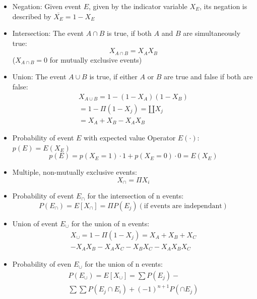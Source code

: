 \documentclass[8pt, landscape, fleqn]{scrartcl}
\begin{document}
\begin{multicols*}{3}
\begin{itemize}
    \item Negation: Given event $E$, given by the indicator variable $X_E$, its negation is described by $\overline{X_E} = 1-X_E$
    \item Intersection: The event $A \cap B$ is true, if both $A$ and $B$ are simultaneously true: \begin{equation} X_{A\cap B} = X_A X_B \end{equation} ($X_{A\cap B} = 0$ for mutually exclusive events)
    \item Union: The event $A \cup B$ is true, if either $A$ or $B$ are true and false if both are false: \begin{align} X_{A \cup B} = 1-(1-X_A)(1-X_B)\\= 1- \Pi(1-X_j) = \amalg X_j \\ = X_A + X_B - X_A X_B \end{align}
    \item Probability of event $E$ with expected value Operator $E(\cdot)$: $p(E) = E(X_E)$ \begin{equation}
        p(E) = p(X_E = 1)\cdot 1 + p(X_E = 0) \cdot 0 = E(X_E)
    \end{equation} 
    \item Multiple, non-mutually exclusive events: \begin{equation}
        X_\cap = \Pi X_i
    \end{equation}
    \item Probability of event $E_\cap$ for the intersection of n events: \begin{equation}
        P(E_\cap ) = E[X_\cap] = \Pi P(E_j) (\text{if events are independant})
    \end{equation}
    \item Union of event $E_\cup$ for the union of n events: \begin{align}
        X_\cup = 1 - \Pi(1-X_j) = X_A + X_B + X_C \\ - X_A X_B - X_A X_C - X_B X_C - X_A X_B X_C \end{align}
    \item Probability of even $E_\cup$ for the union of n events: \begin{align}
        P(E_\cup) = E[X_\cup] = \sum P(E_j) - \\ \sum \sum P(E_j \cap E_i ) + (-1)^{n+1}P(\cap E_j)
    \end{align}
\end{itemize}


\end{multicols*}
\end{document}
